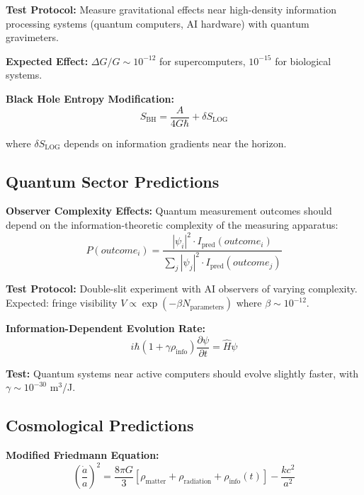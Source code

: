 \documentclass[12pt]{article}
\begin{document}
\textbf{Test Protocol:} Measure gravitational effects near high-density information processing systems (quantum computers, AI hardware) with quantum gravimeters.

\textbf{Expected Effect:} $\Delta G/G \sim 10^{-12}$ for supercomputers, $10^{-15}$ for biological systems.

\textbf{Black Hole Entropy Modification:}
\begin{equation}
S_{\mathrm{BH}} = \frac{A}{4G\hbar} + \delta S_{\mathrm{LOG}} \tag{5.2}
\end{equation}

where $\delta S_{\mathrm{LOG}}$ depends on information gradients near the horizon.

\subsection{Quantum Sector Predictions}

\textbf{Observer Complexity Effects:}
Quantum measurement outcomes should depend on the information-theoretic complexity of the measuring apparatus:
\begin{equation}
P(outcome_i) = \frac{|\psi_i|^2 \cdot I_{\mathrm{pred}}(outcome_i)}{\sum_j |\psi_j|^2 \cdot I_{\mathrm{pred}}(outcome_j)} \tag{5.3}
\end{equation}

\textbf{Test Protocol:} Double-slit experiment with AI observers of varying complexity. Expected: fringe visibility $V \propto \exp(-\beta N_{\mathrm{parameters}})$ where $\beta \sim 10^{-12}$.

\textbf{Information-Dependent Evolution Rate:}
\begin{equation}
i\hbar(1 + \gamma \rho_{\mathrm{info}}) \frac{\partial \psi}{\partial t} = \hat{H}\psi \tag{5.4}
\end{equation}

\textbf{Test:} Quantum systems near active computers should evolve slightly faster, with $\gamma \sim 10^{-30}$ m$^3$/J.

\subsection{Cosmological Predictions}

\textbf{Modified Friedmann Equation:}
\begin{equation}
\left(\frac{\dot{a}}{a}\right)^2 = \frac{8\pi G}{3}[\rho_{\mathrm{matter}} + \rho_{\mathrm{radiation}} + \rho_{\mathrm{info}}(t)] - \frac{kc^2}{a^2} \tag{5.5}
\end{equation}
\end{document}
